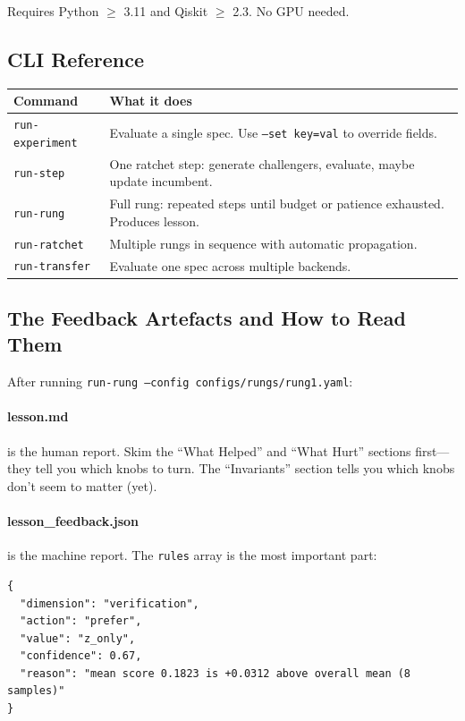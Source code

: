 \documentclass[11pt,a4paper]{article}
\newcommand{\code}[1]{\texttt{#1}}
\begin{document}
Requires Python $\geq$ 3.11 and Qiskit $\geq$ 2.3. No GPU needed.

\subsection{CLI Reference}

\begin{table}[H]
\centering
\small
\begin{tabular}{@{}lp{9cm}@{}}
\toprule
\textbf{Command} & \textbf{What it does} \\
\midrule
\code{run-experiment} & Evaluate a single spec. Use \code{--set key=val} to override fields. \\
\code{run-step} & One ratchet step: generate challengers, evaluate, maybe update incumbent. \\
\code{run-rung} & Full rung: repeated steps until budget or patience exhausted. Produces lesson. \\
\code{run-ratchet} & Multiple rungs in sequence with automatic propagation. \\
\code{run-transfer} & Evaluate one spec across multiple backends. \\
\bottomrule
\end{tabular}
\end{table}

\subsection{The Feedback Artefacts and How to Read Them}
\label{sec:artefacts}

After running \code{run-rung --config configs/rungs/rung1.yaml}:

\paragraph{lesson.md} is the human report. Skim the ``What Helped'' and
``What Hurt'' sections first---they tell you which knobs to turn. The
``Invariants'' section tells you which knobs don't seem to matter (yet).

\paragraph{lesson\_feedback.json} is the machine report. The \code{rules}
array is the most important part:

\begin{lstlisting}[style=python]
{
  "dimension": "verification",
  "action": "prefer",
  "value": "z_only",
  "confidence": 0.67,
  "reason": "mean score 0.1823 is +0.0312 above overall mean (8 samples)"
}
\end{lstlisting}
\end{document}
